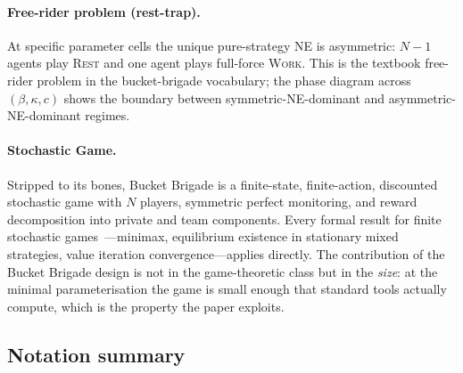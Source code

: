 \documentclass{anvil-paper}
\begin{document}
\paragraph{Free-rider problem (rest-trap).}
At specific parameter cells the unique pure-strategy NE is asymmetric:
$N{-}1$ agents play \textsc{Rest} and one agent plays full-force
\textsc{Work}. This is the textbook free-rider problem in the
bucket-brigade vocabulary; the phase diagram across $(\beta,\kappa,c)$
shows the boundary between symmetric-NE-dominant and
asymmetric-NE-dominant regimes.

\paragraph{Stochastic Game.}
Stripped to its bones, Bucket Brigade is a finite-state, finite-action,
discounted stochastic game with $N$ players, symmetric perfect
monitoring, and reward decomposition into private and team components.
Every formal result for finite stochastic
games~\citep{shapley1953stochastic}---minimax, equilibrium existence
in stationary mixed strategies, value iteration convergence---applies
directly. The contribution of the Bucket Brigade
design is not in the game-theoretic class but in the \emph{size}: at the
minimal parameterisation the game is small enough that standard tools
actually compute, which is the property the paper exploits.

\subsection{Notation summary}
\label{app:envspec:notation}
\end{document}
